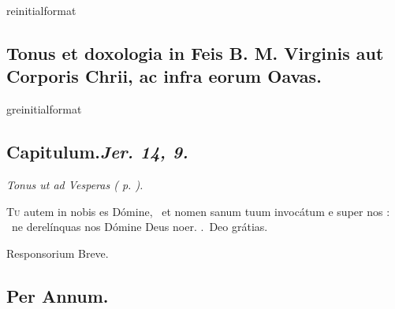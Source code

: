 \documentclass[12pt]{article} %
\newcommand{\myaboveinitial}[1]{%
    \expandafter\renewcommand\csname greinitialformat\endcsname[1]{%
        \fontsize{43}{43}\selectfont ##1
    }
    \gresetfirstlineaboveinitial{\textcolor{benred8}{\raisebox{6.0mm}{\small \textsc{\textbf{#1}}}}}{}
}
\newenvironment{rubric}{\vspace{1 mm}\color{benred8} \itshape \leftskip 0in \setlength{\parindent}{0.25in}}{\vspace{1 mm}}
\newenvironment{response}{\leftskip 0in \setlength{\parindent}{0in}}{\vspace{1 mm}}
\let\oldgresixstar\gresixstar
\renewcommand{\gresixstar}{\textcolor{benred8}{\oldgresixstar}}
\let\oldgredagger\gredagger
\renewcommand{\gredagger}{\textcolor{benred8}{\oldgredagger}}
\let\oldRbar\Rbar
\renewcommand{\Rbar}{\textcolor{benred8}{\oldRbar .}}
\def\capitulumSpace{\hspace{20 mm}}
\begin{document}
\begin{pages}
\begin{Leftside}
\myaboveinitial{II}

\pend\pstart

\subsection*{Tonus et doxologia in Feis B. M. Virginis aut Corporis Chrii, ac infra eorum Oavas.}

\pend\pstart


\myaboveinitial{II}

\pend\pstart


\subsection*{Capitulum.\capitulumSpace \emph{Jer. 14, 9.}}

\pend\pstart

\begin{rubric}
Tonus ut ad Vesperas ( p. \pageref{DominicaCapitulum} ).

\end{rubric}

\pend\pstart

\begin{response}\lettrine{T}{u} autem in nobis es D\'{o}mine, \gredagger\ et nomen sanum tuum invoc\'{a}tum e super nos : \gresixstar\ ne derel\'{i}nquas nos D\'{o}mine Deus noer. \Rbar\ Deo grátias.

\end{response}

\pend\pstart


{
\centering
\textcolor{benred8}{Responsorium Breve.}

}
\subsection*{Per Annum.}


\end{Leftside}
\end{pages}
\end{document}
